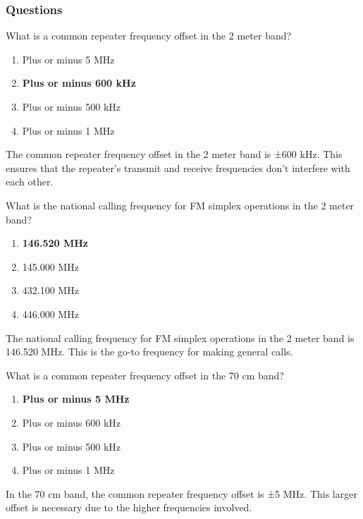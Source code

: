 \subsubsection*{Questions}

\begin{tcolorbox}[colback=gray!10!white,colframe=black!75!black,title={T2A01}]
What is a common repeater frequency offset in the 2 meter band?
\begin{enumerate}[label=\Alph*),noitemsep]
    \item Plus or minus 5 MHz
    \item \textbf{Plus or minus 600 kHz}
    \item Plus or minus 500 kHz
    \item Plus or minus 1 MHz
\end{enumerate}
\end{tcolorbox}
The common repeater frequency offset in the 2 meter band is ±600 kHz. This ensures that the repeater’s transmit and receive frequencies don’t interfere with each other.

\begin{tcolorbox}[colback=gray!10!white,colframe=black!75!black,title={T2A02}]
What is the national calling frequency for FM simplex operations in the 2 meter band?
\begin{enumerate}[label=\Alph*),noitemsep]
    \item \textbf{146.520 MHz}
    \item 145.000 MHz
    \item 432.100 MHz
    \item 446.000 MHz
\end{enumerate}
\end{tcolorbox}
The national calling frequency for FM simplex operations in the 2 meter band is 146.520 MHz. This is the go-to frequency for making general calls.

\begin{tcolorbox}[colback=gray!10!white,colframe=black!75!black,title={T2A03}]
What is a common repeater frequency offset in the 70 cm band?
\begin{enumerate}[label=\Alph*),noitemsep]
    \item \textbf{Plus or minus 5 MHz}
    \item Plus or minus 600 kHz
    \item Plus or minus 500 kHz
    \item Plus or minus 1 MHz
\end{enumerate}
\end{tcolorbox}
In the 70 cm band, the common repeater frequency offset is ±5 MHz. This larger offset is necessary due to the higher frequencies involved.

